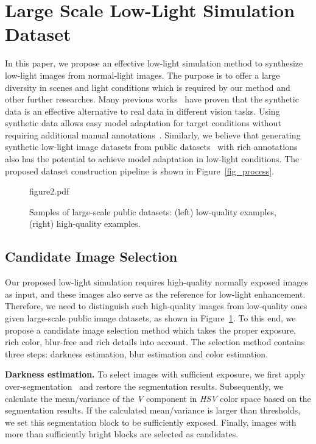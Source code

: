 \section{Large Scale Low-Light Simulation Dataset}
\label{sec_dataset}
In this paper, we propose an effective low-light simulation method to synthesize low-light images from normal-light images. The purpose is to offer a large diversity in scenes and light conditions which is required by our method and other further researches. Many previous works~\cite{FoggySynscapes,semantic:foggy:scene} have proven that the synthetic data is an effective alternative to real data in different vision tasks. Using synthetic data allows easy model adaptation for target conditions without requiring additional manual annotations~\cite{SynRealDataFog19,SynRealDataFogECCV18}. Similarly, we believe that generating synthetic low-light image datasets from public datasets~\cite{bileschi2006streetscenes,everingham2010pascal,grubinger2006iapr,lin2014microsoft} with rich annotations also has the potential to achieve model adaptation in low-light conditions. The proposed dataset construction pipeline is shown in Figure~\ref{fig_process}.

\begin{figure}[t]
	\begin{center}
		\begin{overpic}[width=0.48\textwidth]{figure2.pdf}
		\end{overpic}
	\end{center}
	\caption{Samples of large-scale public datasets: (left) low-quality examples, (right) high-quality examples.}
	\label{fig_second}
\end{figure}

\subsection{Candidate Image Selection}
Our proposed low-light simulation requires high-quality normally exposed images as input, and these images also serve as the reference for low-light enhancement. Therefore, we need to distinguish such high-quality images from low-quality ones given large-scale public image datasets, as shown in Figure~\ref{fig_second}. To this end, we propose a candidate image selection method which takes the proper exposure, rich color, blur-free and rich details into account. The selection method contains three steps: darkness estimation, blur estimation and color estimation.

{\bf Darkness estimation.} To select images with sufficient exposure, we first apply over-segmentation~\cite{achanta2012slic} and restore the segmentation results. Subsequently, we calculate the mean/variance of the \textit{V} component in \textit{HSV} color space based on the segmentation results. If the calculated mean/variance is larger than thresholds, we set this segmentation block to be sufficiently exposed. Finally, images with more than  sufficiently bright blocks are selected as candidates.

